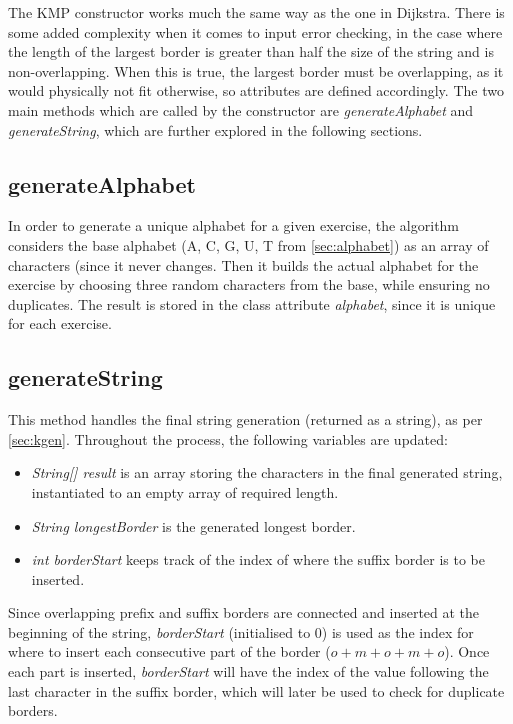 \documentclass{l4proj}
\begin{document}
The KMP constructor works much the same way as the one in Dijkstra. There is some added complexity when it comes to input error checking, in the case where the length of the largest border is greater than half the size of the string and is non-overlapping. When this is true, the largest border must be overlapping, as it would physically not fit otherwise, so attributes are defined accordingly. The two main methods which are called by the constructor are \emph{generateAlphabet} and \emph{generateString}, which are further explored in the following sections.

\subsection{generateAlphabet}

In order to generate a unique alphabet for a given exercise, the algorithm considers the base alphabet (A, C, G, U, T from \autoref{sec:alphabet}) as an array of characters (since it never changes. Then it builds the actual alphabet for the exercise by choosing three random characters from the base, while ensuring no duplicates. The result is stored in the class attribute \emph{alphabet}, since it is unique for each exercise.

\subsection{generateString}

This method handles the final string generation (returned as a string), as per \autoref{sec:kgen}. Throughout the process, the following variables are updated:

\begin{itemize}
	\item
	\emph{String[] result} is an array storing the characters in the final generated string, instantiated to an empty array of required length.
	\item
	\emph{String longestBorder} is the generated longest border.
	\item
	\emph{int borderStart} keeps track of the index of where the suffix border is to be inserted.
\end{itemize}

Since overlapping prefix and suffix borders are connected and inserted at the beginning of the string, \emph{borderStart} (initialised to $0$) is used as the index for where to insert each consecutive part of the border ($o+m+o+m+o$). Once each part is inserted, \emph{borderStart} will have the index of the value following the last character in the suffix border, which will later be used to check for duplicate borders.
\end{document}
